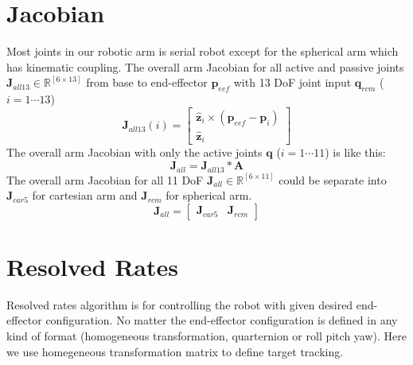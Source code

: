 \documentclass{article}
\begin{document}

\section{Jacobian}
Most joints in our robotic arm is serial robot except for the spherical arm which has kinematic coupling. The overall arm Jacobian for all active and passive joints $\mathbf{J}_{all13} \in \mathbb{R}^{[6\times13]}$ from base to end-effector $\mathbf{p}_{eef}$ with 13 DoF joint input $\mathbf{q}_{rcm}$ ($i=1\cdots13$)
\begin{equation}
\mathbf{J}_{all13}(i) =  \begin{bmatrix}\hat{\mathbf{z}}_i \times (\mathbf{p}_{eef} - \mathbf{p}_i) \\ \hat{\mathbf{z}}_i \end{bmatrix}
\end{equation}
The overall arm Jacobian with only the active joints $\mathbf{q}$ ($i=1\cdots11$) is like this:
\begin{equation}
\mathbf{J}_{all} =  \mathbf{J}_{all13} * \mathbf{A}
\end{equation}
The overall arm Jacobian for all 11 DoF $\mathbf{J}_{all} \in \mathbb{R}^{[6\times11]}$ could be separate into $\mathbf{J}_{car5}$ for cartesian arm and $\mathbf{J}_{rcm}$ for spherical arm.
\begin{equation}
\mathbf{J}_{all} =  \begin{bmatrix} \mathbf{J}_{car5} & \mathbf{J}_{rcm} \end{bmatrix}
\end{equation}

\section{Resolved Rates}
Resolved rates algorithm is for controlling the robot with given desired end-effector configuration. No matter the end-effector configuration is defined in any kind of format (homogeneous transformation, quarternion or roll pitch yaw). Here we use homegeneous transformation matrix to define target tracking.
\end{document}
